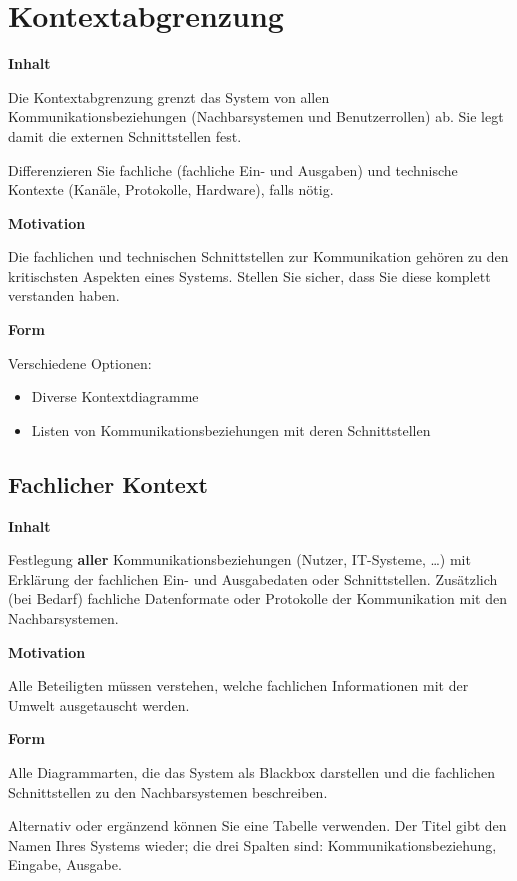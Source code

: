 \hypertarget{kontextabgrenzung}{%
\section{Kontextabgrenzung}\label{kontextabgrenzung}}

\textbf{Inhalt}

Die Kontextabgrenzung grenzt das System von allen
Kommunikationsbeziehungen (Nachbarsystemen und Benutzerrollen) ab. Sie
legt damit die externen Schnittstellen fest.

Differenzieren Sie fachliche (fachliche Ein- und Ausgaben) und
technische Kontexte (Kanäle, Protokolle, Hardware), falls nötig.

\textbf{Motivation}

Die fachlichen und technischen Schnittstellen zur Kommunikation gehören
zu den kritischsten Aspekten eines Systems. Stellen Sie sicher, dass Sie
diese komplett verstanden haben.

\textbf{Form}

Verschiedene Optionen:

\begin{itemize}
\item
  Diverse Kontextdiagramme
\item
  Listen von Kommunikationsbeziehungen mit deren Schnittstellen
\end{itemize}

\hypertarget{fachlicher-kontext}{%
\subsection{Fachlicher Kontext}\label{fachlicher-kontext}}

\textbf{Inhalt}

Festlegung \textbf{aller} Kommunikationsbeziehungen (Nutzer, IT-Systeme,
\ldots) mit Erklärung der fachlichen Ein- und Ausgabedaten oder
Schnittstellen. Zusätzlich (bei Bedarf) fachliche Datenformate oder
Protokolle der Kommunikation mit den Nachbarsystemen.

\textbf{Motivation}

Alle Beteiligten müssen verstehen, welche fachlichen Informationen mit
der Umwelt ausgetauscht werden.

\textbf{Form}

Alle Diagrammarten, die das System als Blackbox darstellen und die
fachlichen Schnittstellen zu den Nachbarsystemen beschreiben.

Alternativ oder ergänzend können Sie eine Tabelle verwenden. Der Titel
gibt den Namen Ihres Systems wieder; die drei Spalten sind:
Kommunikationsbeziehung, Eingabe, Ausgabe.

